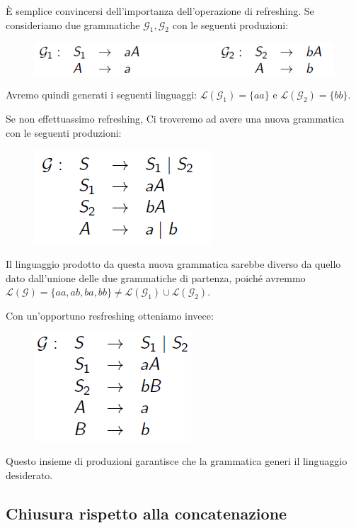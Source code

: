 \documentclass[class=book, crop=false, oneside]{standalone}
\begin{document}
\begin{osservazione}
  È semplice convincersi dell'importanza dell'operazione di refreshing. Se consideriamo due grammatiche \(\mathcal{G}_1, \mathcal{G}_2\) con le seguenti produzioni:
  \begin{figure}
    \centering
    \includegraphics[width=.7\textwidth,keepaspectratio]{why-refresh_1}
  \end{figure}
  \noindent Avremo quindi generati i seguenti linguaggi: \(\mathcal{L}(\mathcal{G}_1)  = \{aa\}\) e \(\mathcal{L}(\mathcal{G}_2)  = \{bb\}\).

  Se non effettuassimo refreshing, Ci troveremo ad avere una nuova grammatica con le seguenti produzioni:
  \begin{figure}
    \centering
    \includegraphics[width=.3\textwidth,keepaspectratio]{why-refresh_2}
  \end{figure}
  \noindent Il linguaggio prodotto da questa nuova grammatica sarebbe diverso da quello dato dall'unione delle due grammatiche di partenza, poiché avremmo \(\mathcal{L(G)} = \{aa, ab, ba, bb\} \neq \mathcal{L}(\mathcal{G}_1)  \cup \mathcal{L}(\mathcal{G}_2) \).

  Con un'opportuno resfreshing otteniamo invece:
  \begin{figure}
    \centering
    \includegraphics[width=.3\textwidth,keepaspectratio]{why-refresh_3}
  \end{figure}
  Questo insieme di produzioni garantisce che la grammatica generi il linguaggio desiderato.
\end{osservazione}

\subsection*{Chiusura rispetto alla concatenazione}
\end{document}
